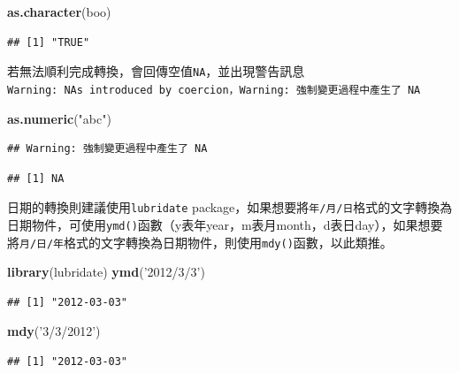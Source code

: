 \documentclass[]{book}
\newenvironment{Shaded}{\begin{snugshade}}{\end{snugshade}}
\newcommand{\KeywordTok}[1]{\textcolor[rgb]{0.13,0.29,0.53}{\textbf{{#1}}}}
\newcommand{\StringTok}[1]{\textcolor[rgb]{0.31,0.60,0.02}{{#1}}}
\newcommand{\NormalTok}[1]{{#1}}
\theoremstyle{definition}
\theoremstyle{definition}
\theoremstyle{remark}
\begin{document}
\begin{Shaded}
\begin{Highlighting}[]
\KeywordTok{as.character}\NormalTok{(boo)}
\end{Highlighting}
\end{Shaded}

\begin{verbatim}
## [1] "TRUE"
\end{verbatim}

若無法順利完成轉換，會回傳空值\texttt{NA}，並出現警告訊息\texttt{Warning:\ NAs\ introduced\ by\ coercion，Warning:\ 強制變更過程中產生了\ NA}

\begin{Shaded}
\begin{Highlighting}[]
\KeywordTok{as.numeric}\NormalTok{(}\StringTok{"abc"}\NormalTok{)}
\end{Highlighting}
\end{Shaded}

\begin{verbatim}
## Warning: 強制變更過程中產生了 NA
\end{verbatim}

\begin{verbatim}
## [1] NA
\end{verbatim}

日期的轉換則建議使用\texttt{lubridate}\citep{R-lubridate}
package，如果想要將\texttt{年/月/日}格式的文字轉換為日期物件，可使用\texttt{ymd()}函數（y表年year，m表月month，d表日day），如果想要將\texttt{月/日/年}格式的文字轉換為日期物件，則使用\texttt{mdy()}函數，以此類推。

\begin{Shaded}
\begin{Highlighting}[]
\KeywordTok{library}\NormalTok{(lubridate)}
\KeywordTok{ymd}\NormalTok{(}\StringTok{'2012/3/3'}\NormalTok{)}
\end{Highlighting}
\end{Shaded}

\begin{verbatim}
## [1] "2012-03-03"
\end{verbatim}

\begin{Shaded}
\begin{Highlighting}[]
\KeywordTok{mdy}\NormalTok{(}\StringTok{'3/3/2012'}\NormalTok{)}
\end{Highlighting}
\end{Shaded}

\begin{verbatim}
## [1] "2012-03-03"
\end{verbatim}
\end{document}
